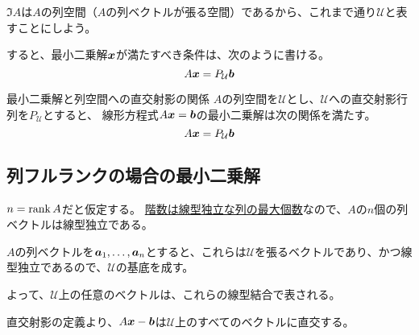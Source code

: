 \documentclass[../../../topic_linear-algebra]{subfiles}
\begin{document}
\br

$\Im A$は$A$の列空間（$A$の列ベクトルが張る空間）であるから、これまで通り$\mathcal{U}$と表すことにしよう。

すると、最小二乗解$\vb*{x}$が満たすべき条件は、次のように書ける。
\begin{equation*}
  A\vb*{x} = P_{\mathcal{U}}\vb*{b}
\end{equation*}

\begin{theorem}{最小二乗解と列空間への直交射影の関係}\label{thm:least-squares-projection}
  $A$の列空間を$\mathcal{U}$とし、$\mathcal{U}$への直交射影行列を$P_{\mathcal{U}}$とすると、
  線形方程式$A\vb*{x} = \vb*{b}$の最小二乗解は次の関係を満たす。
  \begin{equation*}
    A\vb*{x} = P_{\mathcal{U}}\vb*{b}
  \end{equation*}
\end{theorem}

\subsection{列フルランクの場合の最小二乗解}

$n = \rank A$だと仮定する。
\hyperref[thm:rank-equals-max-indep-cols]{階数は線型独立な列の最大個数}なので、$A$の$n$個の列ベクトルは線型独立である。

\br

$A$の列ベクトルを$\vb*{a}_1, \ldots, \vb*{a}_n$とすると、これらは$\mathcal{U}$を張るベクトルであり、かつ線型独立であるので、$\mathcal{U}$の基底を成す。

よって、$\mathcal{U}$上の任意のベクトルは、これらの線型結合で表される。

\br

直交射影の定義より、$A\vb*{x} - \vb*{b}$は$\mathcal{U}$上のすべてのベクトルに直交する。

\br
\end{document}
